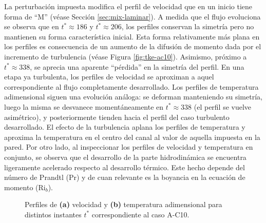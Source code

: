 La perturbación impuesta modifica el perfil de velocidad que en un inicio tiene forma de ``M'' (véase Sección \ref{sec:mix-laminar}). A medida que el flujo evoluciona se observa que en $t^* \approx 186$ y $t^* \approx 206$, los perfiles conservan la simetría pero no mantienen su forma característica inicial. Esta forma relativamente más plana en los perfiles es consecuencia de un aumento de la difusión de momento dada por el incremento de turbulencia (véase Figura \ref{fig:tke-ac10}). Asimismo, próximo a $t^* \approx 338$, se aprecia una aparente ``pérdida'' en la simetría del perfil. En una etapa ya turbulenta, los perfiles de velocidad se aproximan a aquel correspondiente al flujo completamente desarrollado. Los perfiles de temperatura adimensional siguen una evolución análoga: se deforman manteniendo su simetría, luego la misma se desvanece momentáneamente en $t^* \approx 338$ (el perfil se vuelve asimétrico), y posteriormente tienden hacia el perfil del caso turbulento desarrollado. El efecto de la turbulencia aplana los perfiles de temperatura y aproxima la temperatura en el centro del canal al valor de aquella impuesta en la pared. Por otro lado, al inspeccionar los perfiles de velocidad y temperatura en conjunto, se observa que el desarrollo de la parte hidrodinámica se encuentra ligeramente acelerado respecto al desarrollo térmico. Este hecho depende del número de Prandtl (Pr) y de cuan relevante es la boyancia en la ecuación de momento (Ri$_b$).


\begin{figure}[H]
  \centering  
  
  \caption{Perfiles de \textbf{(a)} velocidad y \textbf{(b)} temperatura adimensional para distintos instantes $t^*$ correspondiente al caso A-C10.}
  \label{fig:mosaico-ac10}
\end{figure} 


